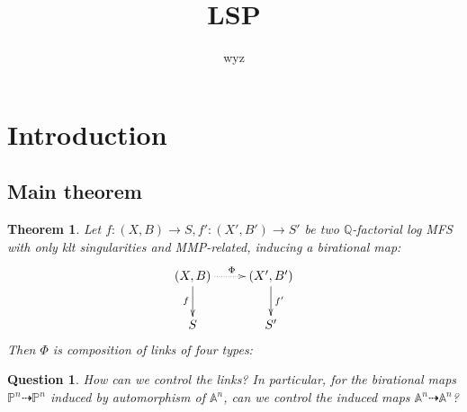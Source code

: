 \documentclass{article}
\title{LSP}
\author{wyz}
\date{}
\newtheorem{thm}[defn]{Theorem}
\newtheorem*{ques}{Question}
\begin{document}
	
\section{Introduction}
	
\subsection{Main theorem}

\begin{thm}
		Let $ f:(X,B)\to S,f':(X',B')\to S' $ be two $ \mathbb{Q} $-factorial log MFS  with only klt singularities and MMP-related, inducing a birational map:
		$$ \xymatrix{
			(X,B)\ar[d]_f\ar@{.>}[r]^\Phi&(X',B')\ar[d]^{f'}\\
			S&S'} $$
		Then $ \Phi  $ is composition  of links of  four types:
\end{thm}
\begin{ques}
	How can we control the links? In particular, for the birational maps $ \mathbb{P}^n\dashrightarrow \mathbb{P}^n $ induced by automorphism of $ \mathbb{A}^n $, can we control the induced maps $ \mathbb{A}^n\dashrightarrow \mathbb{A}^n $?
\end{ques}
\end{document}
